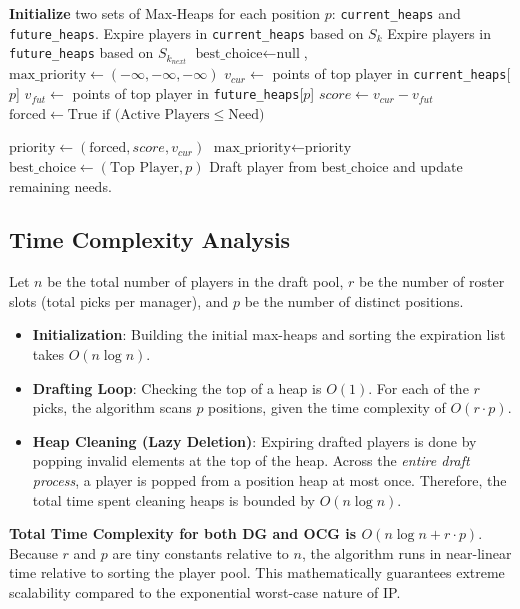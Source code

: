 \documentclass[11pt,a4paper]{article}
\begin{document}
\begin{algorithm}[H]
\caption{Opportunity Cost Greedy (OCG)}
\begin{algorithmic}[1]
\State \textbf{Initialize} two sets of Max-Heaps for each position $p$: \texttt{current\_heaps} and \texttt{future\_heaps}.
    \State Expire players in \texttt{current\_heaps} based on $S_k$
    \State Expire players in \texttt{future\_heaps} based on $S_{k_{next}}$
    \State $\text{best\_choice} \leftarrow \text{null}$, $\text{max\_priority} \leftarrow (-\infty, -\infty, -\infty)$
        \State $v_{cur} \leftarrow$ points of top player in \texttt{current\_heaps}[$p$]
        \State $v_{fut} \leftarrow$ points of top player in \texttt{future\_heaps}[$p$]
        \State $score \leftarrow v_{cur} - v_{fut}$ 
        \State $\text{forced} \leftarrow \text{True if (Active Players} \le \text{Need)}$
        
        \State $\text{priority} \leftarrow (\text{forced}, score, v_{cur})$
            \State $\text{max\_priority} \leftarrow \text{priority}$
            \State $\text{best\_choice} \leftarrow (\text{Top Player}, p)$
        \EndIf
    \EndFor
    \State Draft player from $\text{best\_choice}$ and update remaining needs.
\EndFor
\end{algorithmic}
\end{algorithm}

\subsection{Time Complexity Analysis}
Let $n$ be the total number of players in the draft pool, $r$ be the number of roster slots (total picks per manager), and $p$ be the number of distinct positions.
\begin{itemize}
    \item \textbf{Initialization}: Building the initial max-heaps and sorting the expiration list takes $O(n \log n)$.
    \item \textbf{Drafting Loop}: Checking the top of a heap is $O(1)$. For each of the $r$ picks, the algorithm scans $p$ positions, given the time complexity of $O(r \cdot p)$. 
    \item \textbf{Heap Cleaning (Lazy Deletion)}: Expiring drafted players is done by popping invalid elements at the top of the heap. Across the \textit{entire draft process}, a player is popped from a position heap at most once. Therefore, the total time spent cleaning heaps is bounded by $O(n \log n)$.
\end{itemize}
\textbf{Total Time Complexity for both DG and OCG is $O(n \log n + r \cdot p)$}. Because $r$ and $p$ are tiny constants relative to $n$, the algorithm runs in near-linear time relative to sorting the player pool. This mathematically guarantees extreme scalability compared to the exponential worst-case nature of IP.
\end{document}
